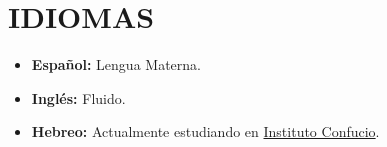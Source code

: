 \documentclass[paper=letter,fontsize=11pt]{scrartcl} %
\newcommand{\sepspace}{\vspace*{1em}}		%
\newcommand{\NewPart}[2]{\section*{\uppercase{#1} \small \normalfont #2}}
\newcommand{\WorkEntry}[5]{
		\noindent \textbf{#1}
        \noindent \small \textit{#2}
        \hfill      %
        \colorbox{White}{%
			\parbox{6em}{%
			\hfill\color{Black}#3}} \par  %
		\noindent \textit{#4} \par        %
		\noindent\hangindent=2em\hangafter=0 \small #5 %
		\normalsize \par}
\newcommand{\Text}[1]{\par       
		\noindent \small #1 
		\normalsize \par}
\begin{document}
\sepspace

\NewPart{IDIOMAS}{}

\begin{itemize}
\item \textbf{Español:} Lengua Materna.
\item \textbf{Inglés:} Fluido.
\item \textbf{Hebreo:} Actualmente estudiando en {\href{http://www.institutoconfucio.iri.edu.ar/}{Instituto Confucio}}.
\end{itemize}

\end{document}
